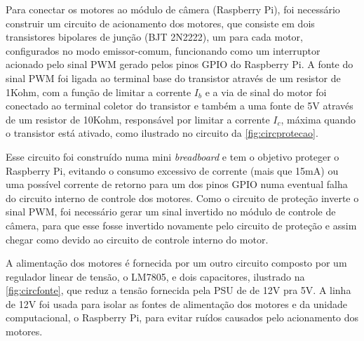 Para conectar os motores ao módulo de câmera (Raspberry Pi), foi necessário construir um circuito de acionamento dos motores, que consiste em dois transistores bipolares de junção (BJT 2N2222), um para cada motor, configurados no modo emissor-comum, funcionando como um interruptor acionado pelo sinal PWM gerado pelos pinos GPIO do Raspberry Pi. A fonte do sinal PWM foi ligada ao terminal base do transistor através de um resistor de 1Kohm, com a função de limitar a corrente $I_b$ e a via de sinal do motor foi conectado ao terminal coletor do transistor e também a uma fonte de 5V através de um resistor de 10Kohm, responsável por limitar a corrente $I_c$, máxima quando o transistor está ativado, como ilustrado no circuito da \autoref{fig:circprotecao}.\par
Esse circuito foi construído numa mini \textit{breadboard} e tem o objetivo proteger o Raspberry Pi, evitando o consumo excessivo de corrente (mais que 15mA) ou uma possível corrente de retorno para um dos pinos GPIO numa eventual falha do circuito interno de controle dos motores. Como o circuito de proteção inverte o sinal PWM, foi necessário gerar um sinal invertido no módulo de controle de câmera, para que esse fosse invertido novamente pelo circuito de proteção e assim chegar como devido ao circuito de controle interno do motor.\par
A alimentação dos motores é fornecida por um outro circuito composto por um regulador linear de tensão, o LM7805, e dois capacitores, ilustrado na \autoref{fig:circfonte}, que reduz a tensão fornecida pela PSU de de 12V pra 5V. A linha de 12V foi usada para isolar as fontes de alimentação dos motores e da unidade computacional, o Raspberry Pi, para evitar ruídos causados pelo acionamento dos motores.

